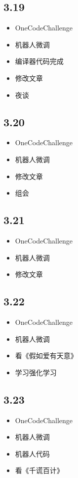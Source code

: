 \documentclass[UTF8]{ctexart}
\begin{document}
\subsection*{3.19}
\begin{itemize}
    \item OneCodeChallenge
    \item 机器人微调
    \item 编译器代码完成
    \item 修改文章
    \item 夜谈
\end{itemize}

\subsection*{3.20}
\begin{itemize}
    \item OneCodeChallenge
    \item 机器人微调
    \item 修改文章
    \item 组会
\end{itemize}

\subsection*{3.21}
\begin{itemize}
    \item OneCodeChallenge
    \item 机器人微调
    \item 修改文章
\end{itemize}

\subsection*{3.22}
\begin{itemize}
    \item OneCodeChallenge
    \item 机器人微调
    \item 看《假如爱有天意》
    \item 学习强化学习
\end{itemize}

\subsection*{3.23}
\begin{itemize}
    \item OneCodeChallenge
    \item 机器人微调
    \item 机器人代码
    \item 看《千谎百计》
\end{itemize}
\end{document}

